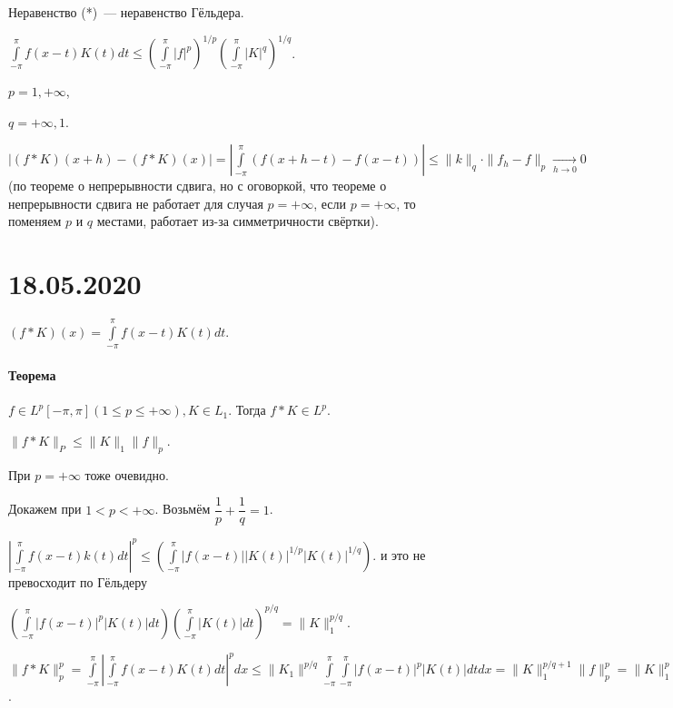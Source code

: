\documentclass{article}
\begin{document}
            Неравенство (*)~--- неравенство Гёльдера.
            
            $\int\limits^{\pi}_{-\pi} f(x - t) K(t) dt \leqslant \left( \int\limits^{\pi}_{-\pi} |f|^p \right)^{1/p} \left( \int\limits^{\pi}_{-\pi} |K|^q \right)^{1/q}$. 
            
            $p = 1, +\infty$, 
            
            $q = +\infty, 1$.
            
            $\left| (f * K) (x + h) - (f * K)(x) \right| = \left| \int\limits^{\pi}_{-\pi}  \left( f(x + h - t) - f(x - t) \right) \right| \leqslant \| k \|_q \cdot \| f_h - f \|_p \xrightarrow[h \rightarrow 0]{} 0$ (по теореме о непрерывности сдвига, но с оговоркой, что теореме о непрерывности сдвига не работает для случая $p = +\infty$, если $p = +\infty$, то поменяем $p$ и $q$ местами, работает из-за симметричности свёртки). 
            
\newpage

\part{18.05.2020}

    $(f * K)(x) = \int\limits^{\pi}_{-\pi} f(x - t) K(t) dt$.
    
    \subsection{Теорема}
    
        $f \in L^p [-\pi, \pi] (1 \leqslant p \leqslant +\infty), K \in L_1$. Тогда $f * K \in L^p$.
        
        $\| f * K \|_P \leqslant \| K \|_1 \| f \|_p$.
        
        При $p = +\infty$ тоже очевидно.
        
        Докажем при $1 < p < +\infty$. Возьмём $\dfrac{1}{p} + \dfrac{1}{q} = 1$.
        
        $\left| \int\limits^{\pi}_{-\pi} f(x - t) k(t) dt \right|^p \leqslant \left( \int\limits^{\pi}_{-\pi} \left| f(x - t) \right| \left| K(t) \right|^{1/p} \left| K(t) \right|^{1/q} \right)$. и это не превосходит по Гёльдеру
        
        $\left( \int\limits^{\pi}_{-\pi} \left| f(x - t) \right|^p \left| K(t) \right| dt \right) \left( \int\limits^{\pi}_{-\pi} \left| K(t) \right| dt \right)^{p/q} = \| K \|^{p/q}_1$.
        
        $\| f * K \|^p_p = \int\limits^{\pi}_{-\pi} \left| \int\limits^{\pi}_{-\pi} f(x - t) K(t) dt \right|^p dx \leqslant \| K_1 \|^{p/q} \int\limits^{\pi}_{-\pi} \int\limits^{\pi}_{-\pi} \left| f(x - t) \right|^p \left| K(t) \right| dt dx = \| K \|^{p/q + 1}_1 \| f \|^p_p = \| K \|^p_1 \| f \|^p_p$.
        
\end{document}
